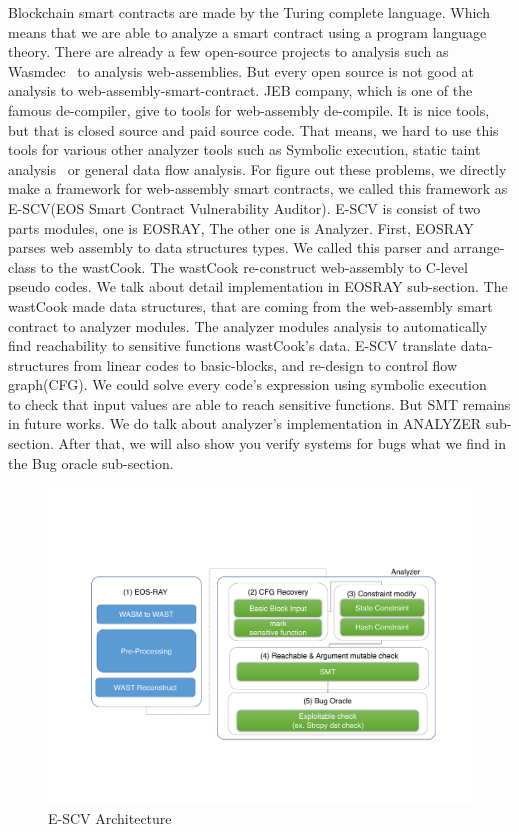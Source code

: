 Blockchain smart contracts are made by the Turing complete language. Which means that we are able to analyze a smart contract using a program language theory. There are already a few open-source projects to analysis such as  Wasmdec~\cite{wasmdec} to analysis web-assemblies. But every open source is not good at analysis to web-assembly-smart-contract. JEB company, which is one of the famous de-compiler, give to tools for web-assembly de-compile. It is nice tools, but that is closed source and paid source code. That means, we hard to use this tools for various other analyzer tools such as Symbolic execution, static taint analysis~\cite{taintAnalysis} or general data flow analysis.
For figure out these problems, we directly make a framework for web-assembly smart contracts, we called this framework as E-SCV(EOS Smart Contract Vulnerability Auditor). E-SCV is consist of two parts modules, one is EOSRAY, The other one is Analyzer. First, EOSRAY parses web assembly to data structures types. We called this parser and arrange-class to the wastCook. The wastCook re-construct web-assembly to C-level pseudo codes. We talk about detail implementation in EOSRAY sub-section. The wastCook made data structures, that are coming from the web-assembly smart contract to analyzer modules. The analyzer modules analysis to automatically find reachability to sensitive functions wastCook's data. E-SCV translate data-structures from linear codes to basic-blocks, and re-design to control flow graph(CFG). We could solve every code's expression using symbolic execution ~\cite{Symbolic_execution} to check that input values are able to reach sensitive functions. But SMT remains in future works. We do talk about analyzer's implementation in ANALYZER sub-section. After that, we will also show you verify systems for bugs what we find in the Bug oracle sub-section.

\begin{figure}[!h] %
  \centering
  \includegraphics[width=\linewidth]{figures/scalableval.pdf}
  \caption{E-SCV Architecture}

\end{figure} 


